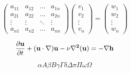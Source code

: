 \documentclass[]{article}
\begin{document}
\begin{equation*}
\begin{pmatrix}
a_{11}&a_{12}&\dots&a_{1n}\\
a_{21}&a_{22}&\dots&a_{2n}\\
\vdots&\vdots&\ddots&\vdots\\
a_{n1}&a_{n2}&\dots&a_{nn}
\end{pmatrix}
\begin{pmatrix}
v_{1}\\
v_{2}\\
\vdots\\
v_{n}
\end{pmatrix}
=
\begin{pmatrix}
w_{1}\\
w_{2}\\
\vdots\\
w_{n}
\end{pmatrix}
\end{equation*}

\begin{equation*}
\frac{\partial{\bf{u}}}{\partial{t}}+(\bf{u}\cdot\nabla)\bf{u}-\nu\nabla^2\bf(u)=-\nabla h
\end{equation*}

\[    		%
\alpha A \beta B \gamma \Gamma \delta \Delta \pi \Pi \omega \Omega 
\]
\end{document}
